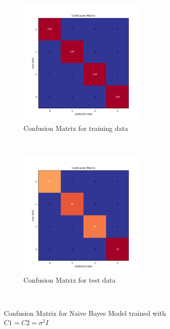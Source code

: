 \begin{figure}[!ht]
    \centering
    \begin{subfigure}[t]{0.5\textwidth}
        \centering
        \includegraphics[height=2.5in]{Dataset_1a/Naive_Bayes_Classifier_case1_cmatrix_train_data.png}
        \caption{Confusion Matrix for training data}
    \end{subfigure}%
    ~ 
    \begin{subfigure}[t]{0.5\textwidth}
        \centering
        \includegraphics[height=2.5in]{Dataset_1a/Naive_Bayes_Classifier_case1_cmatrix_test_data.png}
        \caption{Confusion Matrix for test data}
    \end{subfigure}%
    ~
    \caption{Confusion Matrix for Naive Bayes Model trained with $C1=C2=\sigma^2I$}
    \label{fig:7}
\end{figure}

